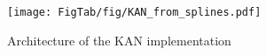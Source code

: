 \begin{figure}[t]
\centering
\texttt{[image: FigTab/fig/KAN\_from\_splines.pdf]}
\caption{Architecture of the KAN implementation}
\label{fig:KAN_from_splines}
\vspace{-2ex}
\end{figure}